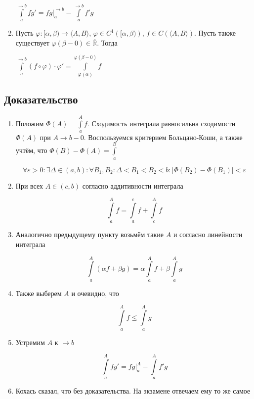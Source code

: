 \documentclass{article}
\begin{document}
\begin{enumerate}
                    $\int\limits^{\rightarrow b}_a f g' = fg \bigg|^{\rightarrow b}_a - \int\limits^{\rightarrow b}_a f'g$
                    
                \item Пусть $\varphi : [\alpha, \beta) \rightarrow \langle A, B \rangle$, $\varphi \in C^1 \left( [\alpha, \beta) \right)$, $f \in C \left( \langle A, B \rangle \right)$. Пусть также существует $\varphi(\beta - 0) \in \overline{\mathbb{R}}$. Тогда
                
                    $\int\limits^{\rightarrow b}_a (f \circ \varphi) \cdot \varphi' = \int\limits^{\varphi(\beta - 0)}_{\varphi(\alpha)} f$
                    
            \end{enumerate}
        
        \subsection{Доказательство}
        
            \begin{enumerate}
            
                \item Положим $\Phi(A) = \int\limits^A_a f$. Сходимость интеграла равносильна сходимости $\Phi(A)$ при $A \rightarrow b - 0$. Воспользуемся критерием Больцано-Коши, а также учтём, что $\Phi(B) - \Phi(A) = \int\limits^B_a$
                
                $$\forall \varepsilon > 0 : \exists \Delta \in (a, b) : \forall B_1, B_2 : \Delta < B_1 < B_2 < b : \left| \Phi(B_2) - \Phi(B_1) \right| < \varepsilon$$
                
                \item При всех $A \in (c, b)$ согласно аддитивности интеграла
                
                    $$\int\limits^A_a f = \int\limits^c_a f + \int\limits^A_c f$$
                    
                \item Аналогично предыдущему пункту возьмём такие $A$ и согласно линейности интеграла
                
                    $$\int\limits^A_a (\alpha f + \beta g) = \alpha \int\limits^A_a f + \beta \int\limits^A_a g$$
                    
                \item Также выберем $A$ и очевидно, что
                
                    $$\int\limits^A_a f \leq \int\limits^A_a g$$
                    
                \item Устремим $A$ к $\rightarrow b$
                
                    $$\int\limits^A_a fg' = fg \bigg|^A_a - \int\limits^A_a f'g$$
                    
                \item Кохась сказал, что без доказательства. На экзамене отвечаем ему то же самое
                
            \end{enumerate}
    
\end{document}
